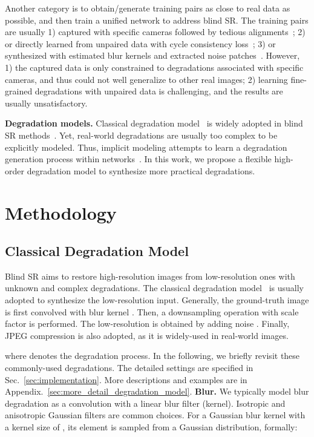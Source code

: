 \documentclass[10pt,twocolumn,letterpaper]{article}
\begin{document}
Another category is to obtain/generate training pairs as close to real data as possible, and then train a unified network to address blind SR.
The training pairs are usually 1) captured with specific cameras followed by tedious alignments~\cite{cai2019toward,wei2020cdc}; 2) or directly learned from unpaired data with cycle consistency loss~\cite{yuan2018unsupervised,lugmayr2019unsupervised}; 3) or synthesized with estimated blur kernels and extracted noise patches~\cite{zhou2019kernel,ji2020real}.
However, 1) the captured data is only constrained to degradations associated with specific cameras, and thus could not well generalize to other real images; 2) learning fine-grained degradations with unpaired data is challenging, and the results are usually unsatisfactory.

\noindent\textbf{Degradation models.}
Classical degradation model~\cite{elad1997restoration,liu2013bayesian} is widely adopted in blind SR methods~\cite{zhang2018learning,gu2019blind,luo2020unfolding}. 
Yet, real-world degradations are usually too complex to be explicitly modeled.
Thus, implicit modeling attempts to learn a degradation generation process within networks~\cite{yuan2018unsupervised,FritscheGT19,wang2021unsupervised}.
In this work, we propose a flexible high-order degradation model to synthesize more practical degradations. 
 

\section{Methodology}

\subsection{Classical Degradation Model}
\label{sec:classical_degradation_model}
Blind SR aims to restore high-resolution images from low-resolution ones with unknown and complex degradations.
The classical degradation model~\cite{elad1997restoration,liu2013bayesian} is usually adopted to synthesize the low-resolution input.
Generally, the ground-truth image  is first convolved with blur kernel . Then, a downsampling operation with scale factor  is performed. The low-resolution  is obtained by adding noise . Finally, JPEG compression is also adopted, as it is widely-used in real-world images.
\vspace{-0.2cm}

where  denotes the degradation process. In the following, we briefly revisit these commonly-used degradations. The detailed settings are specified in Sec.~\ref{sec:implementation}.  More descriptions and examples are in Appendix.~\ref{sec:more_detail_degradation_model}.
\newline\newline
\noindent\textbf{Blur.}
We typically model blur degradation as a convolution with a linear blur filter (kernel).
Isotropic and anisotropic Gaussian filters are common choices.
For a Gaussian blur kernel  with a kernel size of , its  element is sampled from a Gaussian distribution, formally:
\vspace{-0.2cm}
\end{document}
